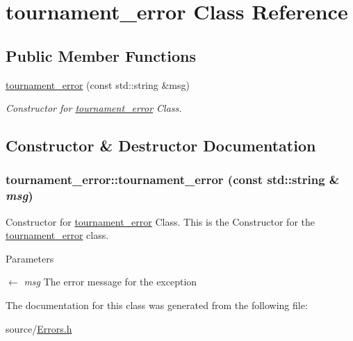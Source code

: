 \hypertarget{classtournament__error}{
\section{tournament\_\-error Class Reference}
\label{classtournament__error}
}
\subsection*{Public Member Functions}
\begin{DoxyCompactItemize}
\item 
\hyperlink{classtournament__error_ad759b11c96107b7ec10c509fec183c37}{tournament\_\-error} (const std::string \&msg)
\begin{DoxyCompactList}\small\item\em Constructor for \hyperlink{classtournament__error}{tournament\_\-error} Class. \item\end{DoxyCompactList}\end{DoxyCompactItemize}


\subsection{Constructor \& Destructor Documentation}
\hypertarget{classtournament__error_ad759b11c96107b7ec10c509fec183c37}{
\subsubsection[{tournament\_\-error}]{\setlength{\rightskip}{0pt plus 5cm}tournament\_\-error::tournament\_\-error (const std::string \& {\em msg})}}
\label{classtournament__error_ad759b11c96107b7ec10c509fec183c37}


Constructor for \hyperlink{classtournament__error}{tournament\_\-error} Class. This is the Constructor for the \hyperlink{classtournament__error}{tournament\_\-error} class. 
\begin{DoxyParams}{Parameters}
\item[\mbox{$\leftarrow$} {\em msg}]The error message for the exception \end{DoxyParams}


The documentation for this class was generated from the following file:\begin{DoxyCompactItemize}
\item 
source/\hyperlink{Errors_8h}{Errors.h}\end{DoxyCompactItemize}
